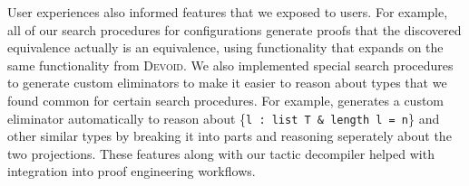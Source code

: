 User experiences also informed features that we exposed to users.
For example, all of our search procedures for configurations generate proofs that the discovered
equivalence actually is an equivalence, using functionality that expands on the same functionality from \textsc{Devoid}.
We also implemented special search procedures to generate custom eliminators to make it easier to reason about
types that we found common for certain search procedures.
For example, \toolname generates a custom eliminator automatically to reason about \{\lstinline{l : list T & length l = n}\}
and other similar types by breaking it into parts and reasoning seperately about the two projections.
These features along with our tactic decompiler helped with integration into proof engineering workflows.







